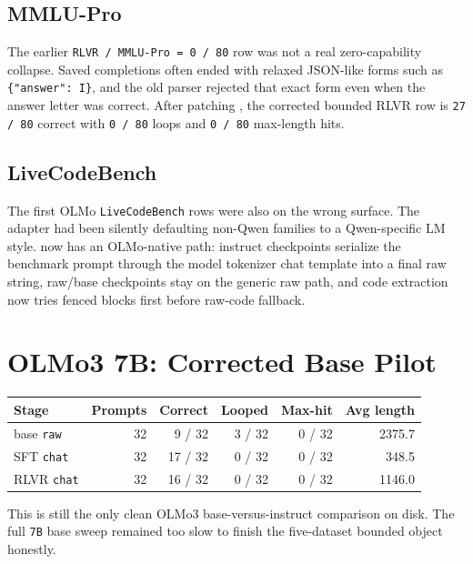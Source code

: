 \documentclass[11pt]{article}
\begin{document}
\subsection*{MMLU-Pro}
The earlier \texttt{RLVR / MMLU-Pro = 0 / 80} row was not a real zero-capability collapse. Saved completions often ended with relaxed JSON-like forms such as \verb|{"answer": I}|, and the old parser rejected that exact form even when the answer letter was correct. After patching , the corrected bounded RLVR row is \texttt{27 / 80} correct with \texttt{0 / 80} loops and \texttt{0 / 80} max-length hits.

\subsection*{LiveCodeBench}
The first OLMo \texttt{LiveCodeBench} rows were also on the wrong surface. The adapter had been silently defaulting non-Qwen families to a Qwen-specific LM style.  now has an OLMo-native path: instruct checkpoints serialize the benchmark prompt through the model tokenizer chat template into a final raw string, raw/base checkpoints stay on the generic raw path, and code extraction now tries fenced blocks first before raw-code fallback.

\section*{OLMo3 7B: Corrected Base Pilot}
\begin{center}
\small
\setlength{\tabcolsep}{6pt}
\begin{tabular}{@{}lrrrrr@{}}
\toprule
Stage & Prompts & Correct & Looped & Max-hit & Avg length \\
\midrule
base \texttt{raw} & 32 & 9 / 32 & 3 / 32 & 0 / 32 & 2375.7 \\
SFT \texttt{chat} & 32 & 17 / 32 & 0 / 32 & 0 / 32 & 348.5 \\
RLVR \texttt{chat} & 32 & 16 / 32 & 0 / 32 & 0 / 32 & 1146.0 \\
\bottomrule
\end{tabular}
\end{center}

This is still the only clean OLMo3 base-versus-instruct comparison on disk. The full \texttt{7B} base sweep remained too slow to finish the five-dataset bounded object honestly.
\end{document}
